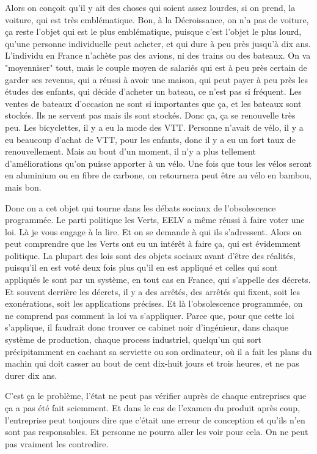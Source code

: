 \begin{description}
Alors on conçoit qu'il y ait des choses qui soient assez lourdes, si on prend, la voiture, qui est très emblématique. Bon, à la Décroissance, on n'a pas de voiture, ça reste l'objet qui est le plus emblématique, puisque c'est l'objet le plus lourd, qu'une personne individuelle peut acheter, et qui dure à peu près jusqu'à dix ans. L'individu en France n'achète pas des avions, ni des trains ou des bateaux. On va "moyenniser" tout, mais le couple moyen de salariés qui est à peu près certain de garder ses revenus, qui a réussi à avoir une maison, qui peut payer à peu près les études des enfants, qui décide d'acheter un bateau, ce n’est pas si fréquent. Les ventes de bateaux d'occasion ne sont si importantes que ça, et les bateaux sont stockés. Ils ne servent pas mais ils sont stockés. Donc ça, ça se renouvelle très peu. Les bicyclettes, il y a eu la mode des VTT. Personne n'avait de vélo, il y a eu beaucoup d'achat de VTT, pour les enfants, donc il y a eu un fort taux de renouvellement. Mais au bout d'un moment, il n'y a plus tellement d'améliorations qu'on puisse apporter à un vélo. Une fois que tous les vélos seront en aluminium ou en fibre de carbone, on retournera peut être au vélo en bambou, mais bon. 

Donc on a cet objet qui tourne dans les débats sociaux de l'obsolescence programmée. Le parti politique les Verts, EELV a même réussi à faire voter une loi. Là je vous engage à la lire. Et on se demande à qui ils s'adressent. Alors on peut comprendre que les Verts ont eu un intérêt à faire ça, qui est évidemment politique. La plupart des lois sont des objets sociaux avant d'être des réalités, puisqu'il en est voté deux fois plus qu'il en est appliqué et celles qui sont appliqués le sont par un système, en tout cas en France, qui s'appelle des décrets. Et souvent derrière les décrets, il y a des arrêtés, des arrêtés qui fixent, soit les exonérations, soit les applications précises. Et là l'obsolescence programmée, on ne comprend pas comment la loi va s'appliquer. Parce que, pour que cette loi s'applique, il faudrait donc trouver ce cabinet noir d'ingénieur, dans chaque système de production, chaque process industriel, quelqu'un qui sort précipitamment en cachant sa serviette ou son ordinateur, où il a fait les plans du machin qui doit casser au bout de cent dix-huit jours et trois heures, et ne pas durer dix ans.

\vspace{1\baselineskip}

C'est ça le problème, l'état ne peut pas vérifier auprès de chaque entreprises que ça a pas été fait sciemment. Et dans le cas de l'examen du produit après coup, l'entreprise peut toujours dire que c'était une erreur de conception et qu’ils n’en sont pas responsables. Et personne ne pourra aller les voir pour cela. On ne peut pas vraiment les contredire.


\end{description}
